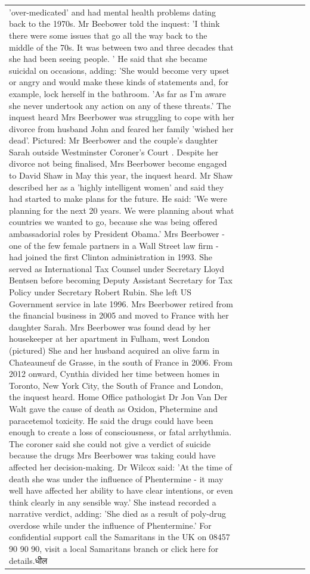 \begin{table}[H]
\begin{tabular}{lllrlllll}
'over-medicated' and had mental health problems dating back to the 1970s. Mr Beebower told the inquest: 'I think there were some issues that go all the way back to the middle of the 70s. It was between two and three decades that she had been seeing people. ' He said that she became suicidal on occasions, adding: 'She would become very upset or angry and would make these kinds of statements and, for example, lock herself in the bathroom. 'As far as I'm aware she never undertook any action on any of these threats.' The inquest heard Mrs Beerbower was struggling to cope with her divorce from husband John and feared her family 'wished her dead'. Pictured: Mr Beerbower and the couple's daughter Sarah outside Westminster Coroner's Court . Despite her divorce not being finalised, Mrs Beerbower become engaged to David Shaw in May this year, the inquest heard. Mr Shaw described her as a 'highly intelligent women' and said they had started to make plans for the future. He said: 'We were planning for the next 20 years. We were planning about what countries we wanted to go, because she was being offered ambassadorial roles by President Obama.' Mrs Beerbower - one of the few female partners in a Wall Street law firm - had joined the first Clinton administration in 1993. She served as International Tax Counsel under Secretary Lloyd Bentsen before becoming Deputy Assistant Secretary for Tax Policy under Secretary Robert Rubin. She left US Government service in late 1996. Mrs Beerbower retired from the financial business in 2005 and moved to France with her daughter Sarah. Mrs Beerbower was found dead by her housekeeper at her apartment in Fulham, west London (pictured) She and her husband acquired an olive farm in Chateauneuf de Grasse, in the south of France in 2006. From 2012 onward, Cynthia divided her time between homes in Toronto, New York City, the South of France and London, the inquest heard. Home Office pathologist Dr Jon Van Der Walt gave the cause of death as Oxidon, Phetermine and paracetemol toxicity. He said the drugs could have been enough to create a loss of consciousness, or fatal arrhythmia. The coroner said she could not give a verdict of suicide because the drugs Mrs Beerbower was taking could have affected her decision-making. Dr Wilcox said: 'At the time of death she was under the influence of Phentermine - it may well have affected her ability to have clear intentions, or even think clearly in any sensible way.' She instead recorded a narrative verdict, adding: 'She died as a result of poly-drug overdose while under the influence of Phentermine.' For confidential support call the Samaritans in the UK on 08457 90 90 90, visit a local Samaritans branch or click here for details.धील \\

\end{tabular}
\end{table}
